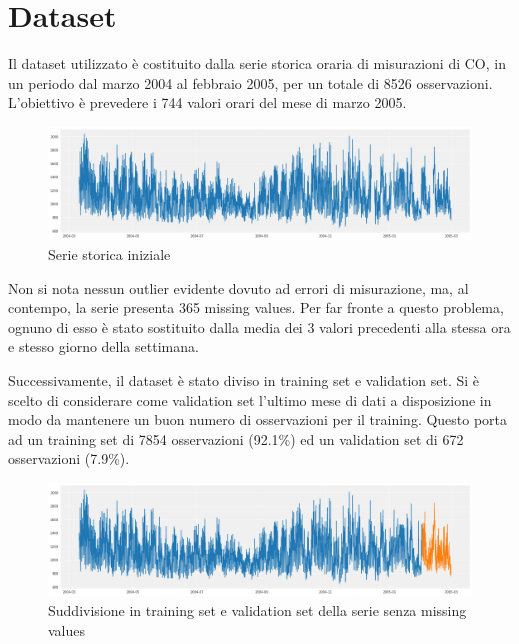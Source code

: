 
\vspace{1cm}
{\let\clearpage\relax \chapter{Dataset}}

Il dataset utilizzato è costituito dalla serie storica oraria di misurazioni di CO, in un periodo dal marzo 2004 al febbraio 2005, per un totale di 8526 osservazioni. L’obiettivo è prevedere i 744 valori orari del mese di marzo 2005. 


\begin{figure}[H]
\centering
\includegraphics[width=14cm]{Pictures/ts.png}
\caption{Serie storica iniziale}
\end{figure}

Non si nota nessun outlier evidente dovuto ad errori di misurazione, ma, al contempo, la serie presenta 365 missing values. Per far fronte a questo problema, ognuno di esso è stato sostituito dalla media dei 3 valori precedenti alla stessa ora e stesso giorno della settimana. 

Successivamente, il dataset è stato diviso in training set e validation set. Si è scelto di considerare come validation set l'ultimo mese di dati a disposizione in modo da mantenere un buon numero di osservazioni per il training. Questo porta ad un training set di 7854 osservazioni (92.1\%) ed un validation set di 672 osservazioni (7.9\%). 

\begin{figure}[H]
\centering
\includegraphics[width=14cm]{Pictures/train_val.png}
\caption{Suddivisione in training set e validation set della serie senza missing values}
\label{train_val}
\end{figure}

